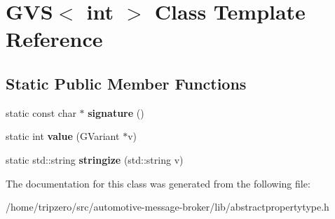 \hypertarget{classGVS_3_01int_01_4}{\section{G\-V\-S$<$ int $>$ Class Template Reference}
\label{classGVS_3_01int_01_4}
}
\subsection*{Static Public Member Functions}
\begin{DoxyCompactItemize}
\item 
\hypertarget{classGVS_3_01int_01_4_aac00b94bc9b614c9adafdecc671b895e}{static const char $\ast$ {\bfseries signature} ()}\label{classGVS_3_01int_01_4_aac00b94bc9b614c9adafdecc671b895e}

\item 
\hypertarget{classGVS_3_01int_01_4_af57dd531535ceb741c65a90520aba578}{static int {\bfseries value} (G\-Variant $\ast$v)}\label{classGVS_3_01int_01_4_af57dd531535ceb741c65a90520aba578}

\item 
\hypertarget{classGVS_3_01int_01_4_ac284bb5efd7dc2bb3f641c94317a3385}{static std\-::string {\bfseries stringize} (std\-::string v)}\label{classGVS_3_01int_01_4_ac284bb5efd7dc2bb3f641c94317a3385}

\end{DoxyCompactItemize}


The documentation for this class was generated from the following file\-:\begin{DoxyCompactItemize}
\item 
/home/tripzero/src/automotive-\/message-\/broker/lib/abstractpropertytype.\-h\end{DoxyCompactItemize}
